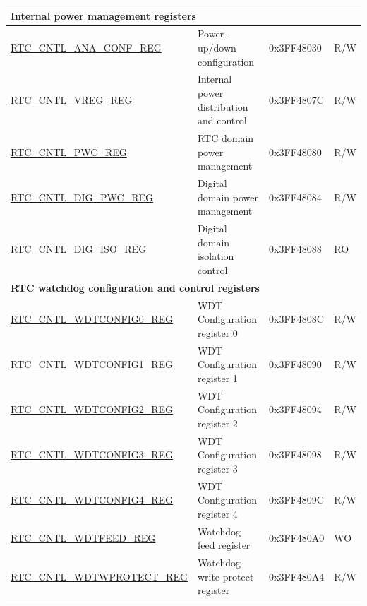 \begin{longtable}{ | p{6.5cm} | p{6cm} | p{2cm} | p{1cm} | }
\multicolumn{4}{|l|}{\textbf{Internal power management registers}} \\ \hline
\hyperref[regdesc:RTCCNTLANACONFREG]{RTC\_CNTL\_ANA\_CONF\_REG} & Power-up/down configuration & 0x3FF48030 & R/W \\ \hline
\hyperref[regdesc:RTCCNTLVREGREG]{RTC\_CNTL\_VREG\_REG} & Internal power distribution and control & 0x3FF4807C & R/W \\ \hline
\hyperref[regdesc:RTCCNTLPWCREG]{RTC\_CNTL\_PWC\_REG} & RTC domain power management & 0x3FF48080 & R/W \\ \hline
\hyperref[regdesc:RTCCNTLDIGPWCREG]{RTC\_CNTL\_DIG\_PWC\_REG} & Digital domain power management & 0x3FF48084 & R/W \\ \hline
\hyperref[regdesc:RTCCNTLDIGISOREG]{RTC\_CNTL\_DIG\_ISO\_REG} & Digital domain isolation control & 0x3FF48088 & RO \\ \hline
\multicolumn{4}{|l|}{\textbf{RTC watchdog configuration and control registers}} \\ \hline
\hyperref[regdesc:RTCCNTLWDTCONFIG0REG]{RTC\_CNTL\_WDTCONFIG0\_REG} & WDT Configuration register 0 & 0x3FF4808C & R/W \\ \hline
\hyperref[regdesc:RTCCNTLWDTCONFIGnREG]{RTC\_CNTL\_WDTCONFIG1\_REG} & WDT Configuration register 1 & 0x3FF48090 & R/W \\ \hline
\hyperref[regdesc:RTCCNTLWDTCONFIGnREG]{RTC\_CNTL\_WDTCONFIG2\_REG} & WDT Configuration register 2 & 0x3FF48094 & R/W \\ \hline
\hyperref[regdesc:RTCCNTLWDTCONFIGnREG]{RTC\_CNTL\_WDTCONFIG3\_REG} & WDT Configuration register 3 & 0x3FF48098 & R/W \\ \hline
\hyperref[regdesc:RTCCNTLWDTCONFIGnREG]{RTC\_CNTL\_WDTCONFIG4\_REG} & WDT Configuration register 4 & 0x3FF4809C & R/W \\ \hline
\hyperref[regdesc:RTCCNTLWDTFEEDREG]{RTC\_CNTL\_WDTFEED\_REG} & Watchdog feed register & 0x3FF480A0 & WO \\ \hline
\hyperref[regdesc:RTCCNTLWDTWPROTECTREG]{RTC\_CNTL\_WDTWPROTECT\_REG} & Watchdog write protect register & 0x3FF480A4 & R/W \\ \hline




\end{longtable}
